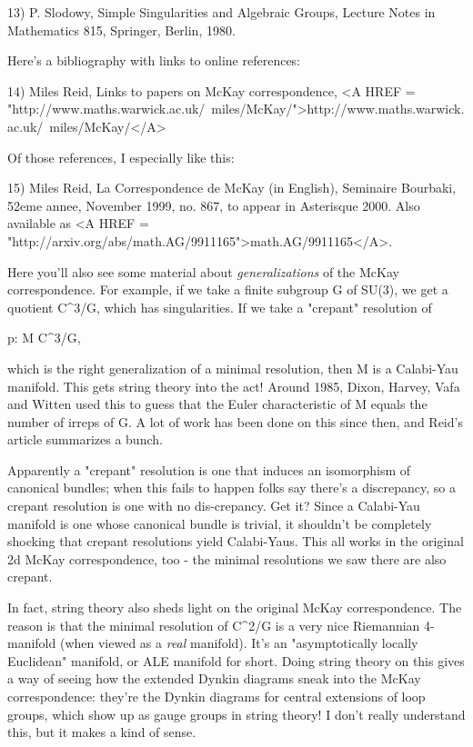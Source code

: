 13) P. Slodowy, Simple Singularities and Algebraic Groups, 
Lecture Notes in Mathematics 815, Springer, Berlin, 1980.

Here's a bibliography with links to online references:

14) Miles Reid, Links to papers on McKay correspondence, 
<A HREF = "http://www.maths.warwick.ac.uk/~miles/McKay/">http://www.maths.warwick.ac.uk/~miles/McKay/</A>

Of those references, I especially like this:

15) Miles Reid, La Correspondence de McKay (in English), 
Seminaire Bourbaki, 52eme annee, November 1999, no. 867, 
to appear in Asterisque 2000.  Also available as <A HREF = 
"http://arxiv.org/abs/math.AG/9911165">math.AG/9911165</A>.

Here you'll also see some material about \emph{generalizations}
of the McKay correspondence.  For example, if we take a finite
subgroup G of SU(3), we get a quotient C^{3}/G, which has 
singularities.  If we take a "crepant" resolution of 

p: M \to  C^{3}/G,

which is the right generalization of a minimal resolution, then
M is a Calabi-Yau manifold.  This gets string theory into the act!
Around 1985, Dixon, Harvey, Vafa and Witten used this to guess 
that the Euler characteristic of M equals the number of irreps of G.
A lot of work has been done on this since then, and Reid's article
summarizes a bunch.

Apparently a "crepant" resolution is one that induces 
an isomorphism of canonical bundles; when this fails to happen
folks say there's a discrepancy, so a crepant resolution is one
with no dis-crepancy.  Get it?  
Since a Calabi-Yau 
manifold is one whose canonical bundle is trivial, it shouldn't
be completely shocking that crepant
resolutions yield Calabi-Yaus.  This all works in the original
2d McKay correspondence, too - the minimal resolutions we saw
there are also crepant.  
 
In fact, string theory also sheds light on the original McKay
correspondence.  The reason is that the minimal resolution of
C^{2}/G is a very nice Riemannian 4-manifold (when viewed as a
\emph{real} manifold).  It's an "asymptotically locally
Euclidean" manifold, or ALE manifold for short.  Doing string
theory on this gives a way of seeing how the extended Dynkin diagrams
sneak into the McKay correspondence: they're the Dynkin diagrams for
central extensions of loop groups, which show up as gauge groups in
string theory!  I don't really understand this, but it makes a kind of
sense.

